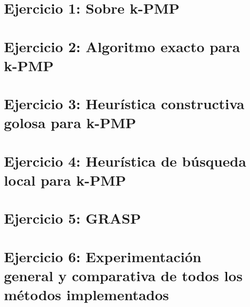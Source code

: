 \documentclass[a4paper]{article}
\begin{document}
\newpage
\section{Ejercicio 1: Sobre k-PMP}


\newpage
\section{Ejercicio 2: Algoritmo exacto para k-PMP}


\newpage
\section{Ejercicio 3: Heurística constructiva golosa para k-PMP}


\newpage
\section{Ejercicio 4: Heurística de búsqueda local para k-PMP}


\newpage
\section{Ejercicio 5: GRASP}


\newpage
\section{Ejercicio 6: Experimentación general y comparativa de todos los
         métodos implementados}







\end{document}
